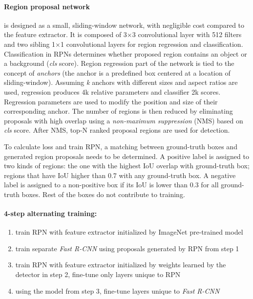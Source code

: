  \paragraph{Region proposal network} is designed as a small, sliding-window network, with negligible cost compared to the feature extractor. It is composed of 3$\times$3 convolutional layer with 512 filters and two sibling 1$\times$1 convolutional layers for region regression and classification. Classification in RPNs determines whether proposed region contains an object or a background (\textit{cls} score). Region regression part of the network is tied to the concept of \textit{anchors} (the anchor is a predefined box centered at a location of sliding-window). Assuming \textit{k} anchors with different sizes and aspect ratios are used, regression produces 4k relative parameters and classifier 2k scores. Regression parameters are used to modify the position and size of their corresponding anchor. The number of regions is then reduced by eliminating proposals with high overlap using a \textit{non-maximum suppression} (NMS) based on \textit{cls} score. After NMS, top-N ranked proposal regions are used for detection.
 
 To calculate loss and train RPN, a matching between ground-truth boxes and generated region proposals needs to be determined. A positive label is assigned to two kinds of regions: the one with the highest IoU overlap with ground-truth box; regions that have IoU higher than 0.7 with any ground-truth box. A negative label is assigned to a non-positive box if its IoU is lower than 0.3 for all ground-truth boxes. Rest of the boxes do not contribute to training. 
 
 \paragraph{4-step alternating training:}
 
 \begin{enumerate}
     \item train RPN with feature extractor initialized by ImageNet pre-trained model
     \item train separate \textit{Fast R-CNN} using proposals generated by RPN from step 1
     \item train RPN with feature extractor initialized by weights learned by the detector in step 2, fine-tune only layers unique to RPN
     \item using the model from step 3, fine-tune layers unique to \textit{Fast R-CNN}
 \end{enumerate}

